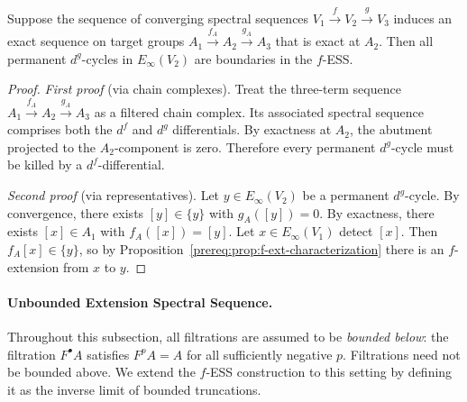 \begin{proposition}\label{prereq:prop:ess-exactness}
    \leanok
    Suppose the sequence of converging spectral sequences $V_1 \xrightarrow{f} V_2 \xrightarrow{g} V_3$ induces an exact sequence on target groups $A_1 \xrightarrow{f_A} A_2 \xrightarrow{g_A} A_3$ that is exact at $A_2$. Then all permanent $d^g$-cycles in $E_\infty(V_2)$ are boundaries in the $f$-ESS.
\end{proposition}
\begin{proof}
    \emph{First proof} (via chain complexes). Treat the three-term sequence $A_1 \xrightarrow{f_A} A_2 \xrightarrow{g_A} A_3$ as a filtered chain complex. Its associated spectral sequence comprises both the $d^f$ and $d^g$ differentials. By exactness at $A_2$, the abutment projected to the $A_2$-component is zero. Therefore every permanent $d^g$-cycle must be killed by a $d^f$-differential.

    \emph{Second proof} (via representatives). Let $y \in E_\infty(V_2)$ be a permanent $d^g$-cycle. By convergence, there exists $[y] \in \{y\}$ with $g_A([y]) = 0$. By exactness, there exists $[x] \in A_1$ with $f_A([x]) = [y]$. Let $x \in E_\infty(V_1)$ detect $[x]$. Then $f_A[x] \in \{y\}$, so by Proposition~\ref{prereq:prop:f-ext-characterization} there is an $f$-extension from $x$ to $y$.
\end{proof}

\paragraph{Unbounded Extension Spectral Sequence.}\label{sec:prereq-unbounded-ess}

Throughout this subsection, all filtrations are assumed to be \emph{bounded below}: the filtration $F^\bullet A$ satisfies $F^p A = A$ for all sufficiently negative $p$. Filtrations need not be bounded above. We extend the $f$-ESS construction to this setting by defining it as the inverse limit of bounded truncations.

